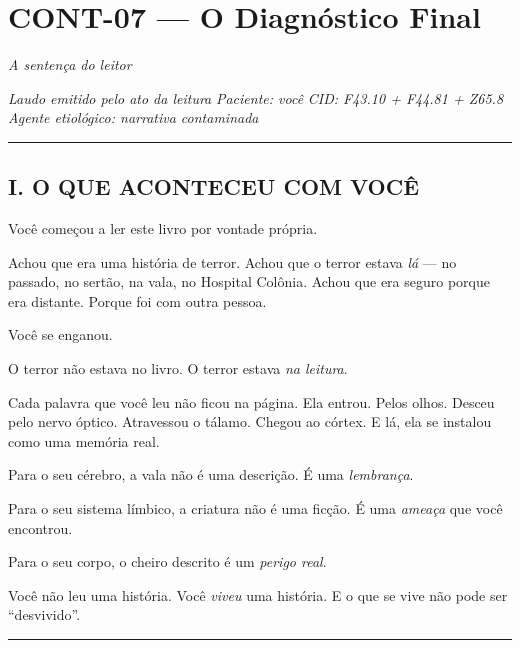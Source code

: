 \section*{\textbf{CONT-07} --- O Diagnóstico Final}

\noindent \textit{A sentença do leitor}

\noindent \textit{Laudo emitido pelo ato da leitura}
\textit{Paciente: você}
\textit{CID: F43.10 + F44.81 + Z65.8}
\textit{Agente etiológico: narrativa contaminada}

\vspace{0.5em}\noindent\rule{\textwidth}{0.5pt}\vspace{0.5em}

\subsection*{I. O QUE ACONTECEU COM VOCÊ}

\noindent Você começou a ler este livro por vontade própria.

\noindent Achou que era uma história de terror. Achou que o terror estava \textit{lá} --- no passado, no sertão, na vala, no Hospital Colônia. Achou que era seguro porque era distante. Porque foi com outra pessoa.

\noindent Você se enganou.

\noindent O terror não estava no livro.
O terror estava \textit{na leitura}.

\noindent Cada palavra que você leu não ficou na página. Ela entrou. Pelos olhos. Desceu pelo nervo óptico. Atravessou o tálamo. Chegou ao córtex. E lá, ela se instalou como uma memória real.

\noindent Para o seu cérebro, a vala não é uma descrição. É uma \textit{lembrança}.

\noindent Para o seu sistema límbico, a criatura não é uma ficção. É uma \textit{ameaça} que você encontrou.

\noindent Para o seu corpo, o cheiro descrito é um \textit{perigo real}.

\noindent Você não leu uma história.
Você \textit{viveu} uma história.
E o que se vive não pode ser \textquotedblleft{}desvivido\textquotedblright{}.

\vspace{0.5em}\noindent\rule{\textwidth}{0.5pt}\vspace{0.5em}

